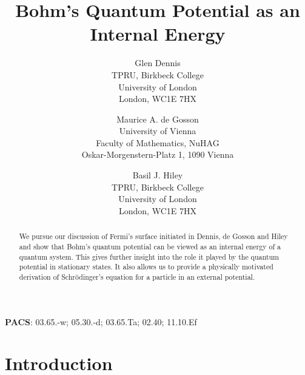 \documentclass[12pt]{article}%
\begin{document}
\title{Bohm's Quantum Potential as an Internal Energy}
\author{Glen Dennis\\TPRU, Birkbeck College\\University of London\\London, WC1E 7HX
\and Maurice A. de Gosson\\University of Vienna\\Faculty of Mathematics, NuHAG\\Oskar-Morgenstern-Platz 1, 1090 Vienna
\and Basil J. Hiley\\TPRU, Birkbeck College\\University of London\\London, WC1E 7HX}
\maketitle

\begin{abstract}
We pursue our discussion of Fermi's surface initiated in Dennis, de Gosson and
Hiley and show that Bohm's quantum potential can be viewed as an internal
energy of a quantum system. This gives further insight into the role it played
by the quantum potential in stationary states. It also allows us to provide a
physically motivated derivation of Schr\"{o}dinger's equation for a particle
in an external potential.

\end{abstract}

\noindent\textbf{PACS}: 03.65.-w; 05.30.-d; 03.65.Ta; 02.40; 11.10.Ef

\newpage

\section{Introduction}
\end{document}
